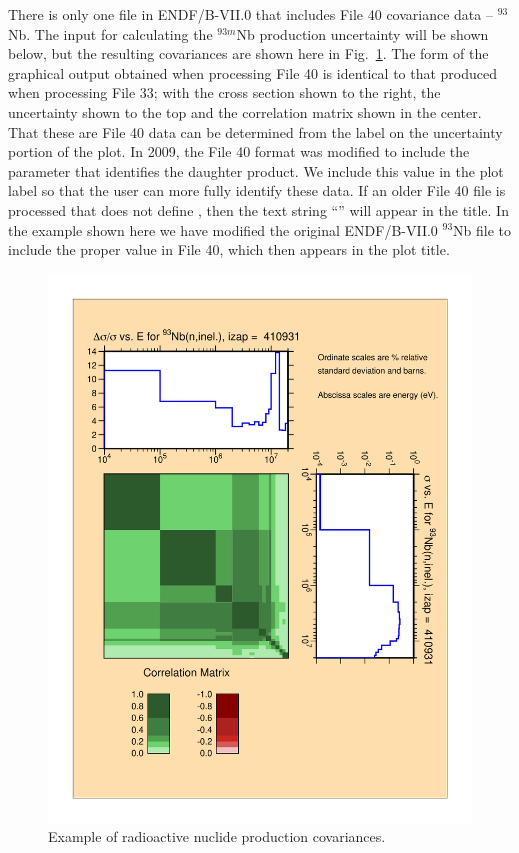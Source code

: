 There is only one file in ENDF/B-VII.0 that includes File 40 covariance
data -- $^{93}$Nb.  The input for calculating the $^{93m}$Nb production
uncertainty will be shown below, but the resulting covariances are shown
here in Fig.~\ref{mf40cov}.  The form of the graphical output
obtained when processing File 40 is identical to that produced when
processing File 33; with the cross section shown to the right, the
uncertainty shown to the top and the correlation matrix shown in the
center.  That these are File 40 data can be determined from the label
on the uncertainty portion of the plot.  In 2009, the File 40 format
was modified to include the  parameter that identifies the daughter
product.  We include this  value in the plot label so that the user
can more fully identify these data.  If an older File 40 file is processed
that does not define , then the text string ``'' will
appear in the title.  In the example shown here we have modified the original
ENDF/B-VII.0 $^{93}$Nb file to include the proper  value in
File 40, which then appears in the plot title.

\begin{figure}[t]\centering
\includegraphics[keepaspectratio, width=5in, angle=0]{figs/mf40covack}
\caption[Radioactive nuclide production covariance example]{Example of
 radioactive nuclide production covariances.}
\label{mf40cov}
\end{figure}

